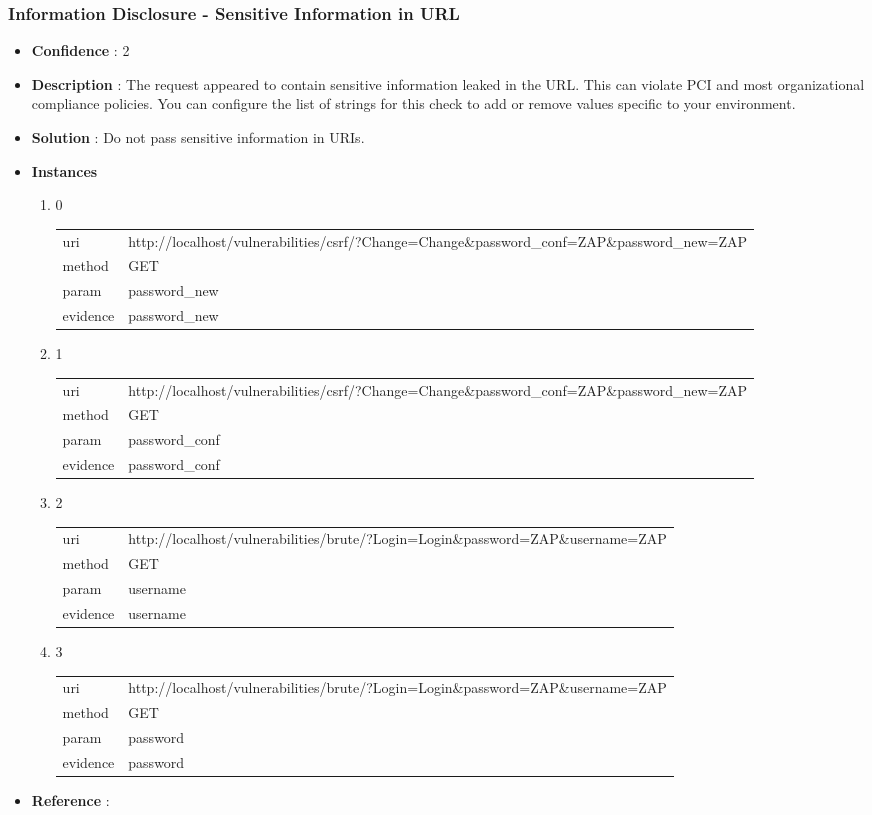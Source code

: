 \documentclass[10pt]{article}
\begin{document}
\subsubsection{Information Disclosure - Sensitive Information in URL}
\begin{itemize}
\item[] \textbf{Confidence} : 2
\item[] \textbf{Description} : The request appeared to contain sensitive information leaked in the URL. This can violate PCI and most organizational compliance policies. You can configure the list of strings for this check to add or remove values specific to your environment.
\item[] \textbf{Solution} :  Do not pass sensitive information in URIs.
\item[] \textbf{Instances}
\begin{enumerate}
\item[] 0
\begin{tabular}{| l | p{14cm}}
uri & http://localhost/vulnerabilities/csrf/?Change=Change\&password{\_}conf=ZAP\&password{\_}new=ZAP \\
method & GET \\
param & password{\_}new \\
evidence & password{\_}new \\
\end{tabular}
\item[] 1
\begin{tabular}{| l | p{14cm}}
uri & http://localhost/vulnerabilities/csrf/?Change=Change\&password{\_}conf=ZAP\&password{\_}new=ZAP \\
method & GET \\
param & password{\_}conf \\
evidence & password{\_}conf \\
\end{tabular}
\item[] 2
\begin{tabular}{| l | p{14cm}}
uri & http://localhost/vulnerabilities/brute/?Login=Login\&password=ZAP\&username=ZAP \\
method & GET \\
param & username \\
evidence & username \\
\end{tabular}
\item[] 3
\begin{tabular}{| l | p{14cm}}
uri & http://localhost/vulnerabilities/brute/?Login=Login\&password=ZAP\&username=ZAP \\
method & GET \\
param & password \\
evidence & password \\
\end{tabular}
\end{enumerate}
\item[] \textbf{Reference} : 
\end{itemize}
\end{document}
